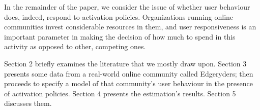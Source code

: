 In the remainder of the paper, we consider the issue of whether user behaviour does, indeed, respond to activation policies. Organizations running online communities invest considerable resources in them, and user responsiveness is an important parameter in making the decision of how much to spend in this activity as opposed to other, competing ones.  

Section 2 briefly examines the literature that we mostly draw upon. Section 3 presents some data from a real-world online community called Edgeryders; then proceeds to specify a model of that community's user behaviour in the presence of activation policies. Section 4 presents the estimation's results. Section 5 discusses them.